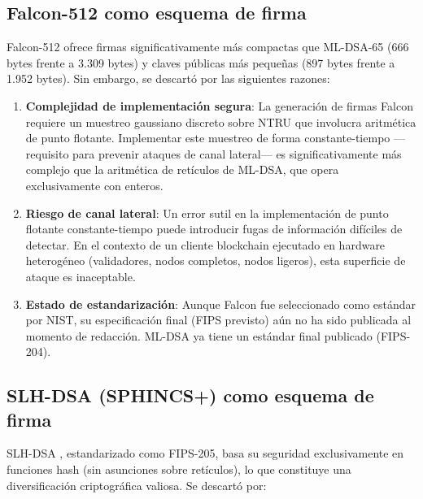\subsection{Falcon-512 como esquema de firma}

Falcon-512 \parencite{nistfips205} ofrece firmas significativamente más compactas que ML-DSA-65 (666 bytes frente a 3.309 bytes) y claves públicas más pequeñas (897 bytes frente a 1.952 bytes). Sin embargo, se descartó por las siguientes razones:

\begin{enumerate}
  \item \textbf{Complejidad de implementación segura}: La generación de firmas Falcon requiere un muestreo gaussiano discreto sobre NTRU que involucra aritmética de punto flotante. Implementar este muestreo de forma constante-tiempo ---requisito para prevenir ataques de canal lateral--- es significativamente más complejo que la aritmética de retículos de ML-DSA, que opera exclusivamente con enteros.
  
  \item \textbf{Riesgo de canal lateral}: Un error sutil en la implementación de punto flotante constante-tiempo puede introducir fugas de información difíciles de detectar. En el contexto de un cliente blockchain ejecutado en hardware heterogéneo (validadores, nodos completos, nodos ligeros), esta superficie de ataque es inaceptable.
  
  \item \textbf{Estado de estandarización}: Aunque Falcon fue seleccionado como estándar por NIST, su especificación final (FIPS previsto) aún no ha sido publicada al momento de redacción. ML-DSA ya tiene un estándar final publicado (FIPS-204).
\end{enumerate}

\subsection{SLH-DSA (SPHINCS+) como esquema de firma}

SLH-DSA \parencite{nistfips205}, estandarizado como FIPS-205, basa su seguridad exclusivamente en funciones hash (sin asunciones sobre retículos), lo que constituye una diversificación criptográfica valiosa. Se descartó por:


